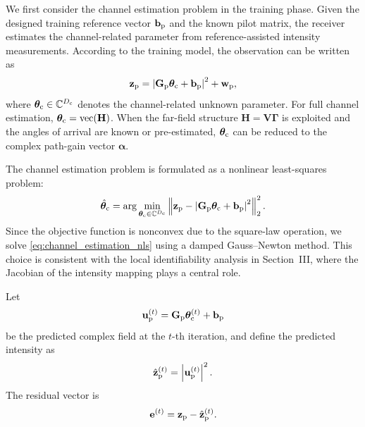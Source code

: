 \documentclass[journal]{IEEEtran}
\begin{document}
We first consider the channel estimation problem in the training phase. 
Given the designed training reference vector $\mathbf{b}_{\rm p}$ and the known pilot matrix, the receiver estimates the channel-related parameter from reference-assisted intensity measurements. 
According to the training model, the observation can be written as
\begin{equation}
\mathbf{z}_{\rm p}
=
\left|
\mathbf{G}_{\rm p}\boldsymbol{\theta}_{\rm c}
+
\mathbf{b}_{\rm p}
\right|^2
+
\mathbf{w}_{\rm p},
\label{eq:channel_estimation_model}
\end{equation}
where $\boldsymbol{\theta}_{\rm c}\in\mathbb{C}^{D_{\rm c}}$ denotes the channel-related unknown parameter. 
For full channel estimation, $\boldsymbol{\theta}_{\rm c}=\operatorname{vec}(\mathbf{H})$. 
When the far-field structure $\mathbf{H}=\mathbf{V}\boldsymbol{\Gamma}$ is exploited and the angles of arrival are known or pre-estimated, $\boldsymbol{\theta}_{\rm c}$ can be reduced to the complex path-gain vector $\boldsymbol{\alpha}$.

The channel estimation problem is formulated as a nonlinear least-squares problem:
\begin{equation}
\hat{\boldsymbol{\theta}}_{\rm c}
=
\arg\min_{\boldsymbol{\theta}_{\rm c}\in\mathbb{C}^{D_{\rm c}}}
\left\|
\mathbf{z}_{\rm p}
-
\left|
\mathbf{G}_{\rm p}\boldsymbol{\theta}_{\rm c}
+
\mathbf{b}_{\rm p}
\right|^2
\right\|_2^2.
\label{eq:channel_estimation_nls}
\end{equation}
Since the objective function is nonconvex due to the square-law operation, we solve \eqref{eq:channel_estimation_nls} using a damped Gauss--Newton method. 
This choice is consistent with the local identifiability analysis in Section~III, where the Jacobian of the intensity mapping plays a central role.

Let
\begin{equation}
\mathbf{u}_{\rm p}^{(t)}
=
\mathbf{G}_{\rm p}\boldsymbol{\theta}_{\rm c}^{(t)}
+
\mathbf{b}_{\rm p}
\end{equation}
be the predicted complex field at the $t$-th iteration, and define the predicted intensity as
\begin{equation}
\hat{\mathbf{z}}_{\rm p}^{(t)}
=
\left|
\mathbf{u}_{\rm p}^{(t)}
\right|^2.
\end{equation}
The residual vector is
\begin{equation}
\mathbf{e}^{(t)}
=
\mathbf{z}_{\rm p}
-
\hat{\mathbf{z}}_{\rm p}^{(t)}.
\end{equation}
\end{document}
